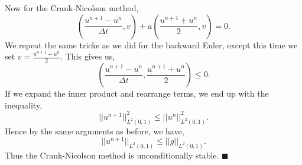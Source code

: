 \documentclass[11pt]{article}
\begin{document}
Now for the Crank-Nicolson method,
\begin{equation*}
    (\frac{u^{n+1} - u^n}{\Delta t}, v) + a(\frac{u^{n+1} + u^n}{2}, v) = 0.
\end{equation*}
We repeat the same tricks as we did for the backward Euler, except this time we set $v = \frac{u^{n+1} + u^n}{2}$.
This gives us,
\begin{equation*}
    (\frac{u^{n+1} - u^n}{\Delta t}, \frac{u^{n+1} + u^n}{2}) \leq 0.
\end{equation*}
If we expand the inner product and rearrange terms, we end up with the inequality,
\begin{equation*}
    ||u^{n+1}||^2_{L^2(0,1)} \leq ||u^{n}||^2_{L^2(0,1)}.
\end{equation*}
Hence by the same arguments as before, we have,
\begin{equation*}
    ||u^{n+1}||_{L^2(0,1)} \leq ||g||_{L^2(0,1)}.
\end{equation*}
Thus the Crank-Nicolson method is unconditionally stable.
$\blacksquare$
\end{document}
